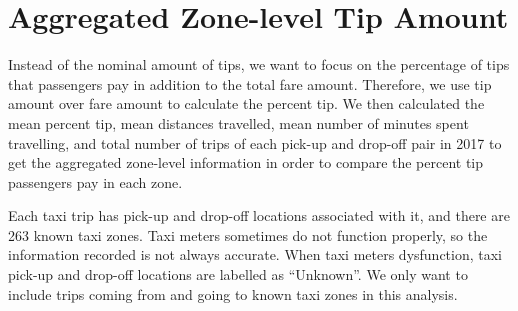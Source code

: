 \documentclass[12pt,twoside]{reedthesis}
\newenvironment{Shaded}{\begin{snugshade}}{\end{snugshade}}
\newcommand{\KeywordTok}[1]{\textcolor[rgb]{0.13,0.29,0.53}{\textbf{#1}}}
\newcommand{\DataTypeTok}[1]{\textcolor[rgb]{0.13,0.29,0.53}{#1}}
\newcommand{\DecValTok}[1]{\textcolor[rgb]{0.00,0.00,0.81}{#1}}
\newcommand{\StringTok}[1]{\textcolor[rgb]{0.31,0.60,0.02}{#1}}
\newcommand{\OperatorTok}[1]{\textcolor[rgb]{0.81,0.36,0.00}{\textbf{#1}}}
\newcommand{\NormalTok}[1]{#1}
\theoremstyle{definition}
\theoremstyle{definition}
\theoremstyle{definition}
\theoremstyle{remark}
\begin{document}
\section{Aggregated Zone-level Tip
Amount}\label{aggregated-zone-level-tip-amount}

Instead of the nominal amount of tips, we want to focus on the
percentage of tips that passengers pay in addition to the total fare
amount. Therefore, we use tip amount over fare amount to calculate the
percent tip. We then calculated the mean percent tip, mean distances
travelled, mean number of minutes spent travelling, and total number of
trips of each pick-up and drop-off pair in 2017 to get the aggregated
zone-level information in order to compare the percent tip passengers
pay in each zone.
\begin{Shaded}
\end{Shaded}
Each taxi trip has pick-up and drop-off locations associated with it,
and there are 263 known taxi zones. Taxi meters sometimes do not
function properly, so the information recorded is not always accurate.
When taxi meters dysfunction, taxi pick-up and drop-off locations are
labelled as ``Unknown''. We only want to include trips coming from and
going to known taxi zones in this analysis.
\end{document}
